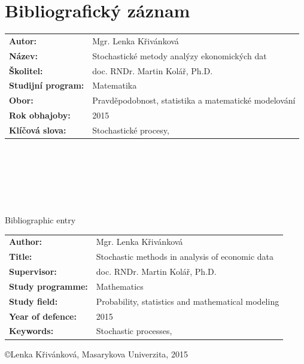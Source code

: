 \documentclass[a4paper,12pt]{report}
\theoremstyle{definition} \newtheorem{definice}[veta]{Definice}
\theoremstyle{remark}
\begin{document}
\normalsize



\chapter*{Bibliografický záznam}
\setcounter{page}{1}

\begin{tabular}{p{3.9cm}  p{9.1cm}}
\textbf{Autor:} & Mgr. Lenka Křivánková \\
\textbf{Název:} & Stochastické metody analýzy ekonomických dat \\
\textbf{Školitel:} & doc. RNDr. Martin Kolář, Ph.D.  \\
\textbf{Studijní program:} & Matematika \\
\textbf{Obor:} & Pravděpodobnost, statistika a matematické modelování \\
\textbf{Rok obhajoby:} & 2015 \\
\textbf{Klíčová slova:} & Stochastické procesy, \\
\end{tabular}
\\\\\\\\\\

\begin{flushright} {{\Huge Bibliographic entry}} \vspace{38pt} \end{flushright}

\hspace{-0.7cm}
\begin{tabular}{p{3.9cm}  p{9.1cm}}
\textbf{Author:} & Mgr. Lenka Křivánková \\
\textbf{Title:} & Stochastic methods in analysis of economic data \\
\textbf{Supervisor:} & doc. RNDr. Martin Kolář, Ph.D.  \\
\textbf{Study programme:} & Mathematics \\
\textbf{Study field:} & Probability, statistics and mathematical modeling \\
\textbf{Year of defence:} & 2015 \\
\textbf{Keywords:} & Stochastic processes, \\
\end{tabular}
\newpage
\pagestyle{empty}
\null
\vfill
\begin{center}
\copyright \quad Lenka Křivánková, Masarykova Univerzita, 2015
\end{center}
\end{document}
